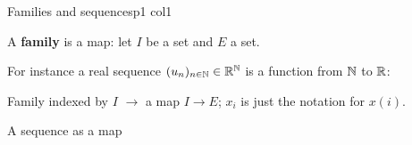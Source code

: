 \documentclass[course,noautoquant,noautokw]{neyvia-study}
\begin{document}
\begin{concept}[1.7]{Families and sequences}{p1 col1}
\begin{definition}
\noindent A \textbf{family} is a map: let $I$ be a set and $E$ a set.
\par\noindent For instance a real sequence $(u_n)_{n\in\mathbb{N}}\in\mathbb{R}^{\mathbb{N}}$ is a function from $\mathbb{N}$ to $\mathbb{R}$:
\end{definition}
\begin{reflex}
Family indexed by $I$ \ensuremath{\rightarrow} a map $I\to E$; $x_i$ is just the notation for $x(i)$.
\end{reflex}
\begin{worked}{A sequence as a map}
\end{worked}
\begin{traps}
\end{traps}
\begin{practice}
\end{practice}
\end{concept}
\end{document}

